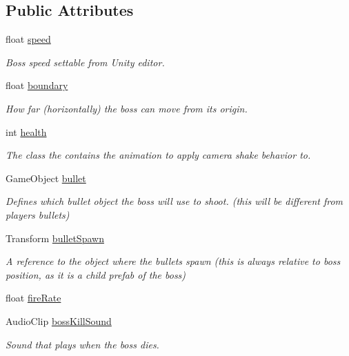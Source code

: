 \subsection*{Public Attributes}
\begin{DoxyCompactItemize}
\item 
float \mbox{\hyperlink{class_queen_bauss_a11c5f07cee01d4587cad453edbb32fa3}{speed}}
\begin{DoxyCompactList}\small\item\em Boss speed settable from Unity editor. \end{DoxyCompactList}\item 
float \mbox{\hyperlink{class_queen_bauss_a738d137bcf9a273c67a1b122c6f28822}{boundary}}
\begin{DoxyCompactList}\small\item\em How far (horizontally) the boss can move from its origin. \end{DoxyCompactList}\item 
int \mbox{\hyperlink{class_queen_bauss_a4b5e0b4ec9040a158c5fafca921593e2}{health}}
\begin{DoxyCompactList}\small\item\em The class the contains the animation to apply camera shake behavior to. \end{DoxyCompactList}\item 
Game\+Object \mbox{\hyperlink{class_queen_bauss_a3b035e20519b15a46b1cfa28a3300d1a}{bullet}}
\begin{DoxyCompactList}\small\item\em Defines which bullet object the boss will use to shoot. (this will be different from player\textquotesingle{}s bullets) \end{DoxyCompactList}\item 
Transform \mbox{\hyperlink{class_queen_bauss_a5c17fa20ec6761760b7651176a1c1e7e}{bullet\+Spawn}}
\begin{DoxyCompactList}\small\item\em A reference to the object where the bullets spawn (this is always relative to boss position, as it is a child prefab of the boss) \end{DoxyCompactList}\item 
float \mbox{\hyperlink{class_queen_bauss_a493ca87e362739138d3a758f267c2f9c}{fire\+Rate}}
\item 
Audio\+Clip \mbox{\hyperlink{class_queen_bauss_ab1eb1668c503a5ccef801c9d689f756f}{boss\+Kill\+Sound}}
\begin{DoxyCompactList}\small\item\em Sound that plays when the boss dies. \end{DoxyCompactList}\item 

\end{DoxyCompactItemize}

